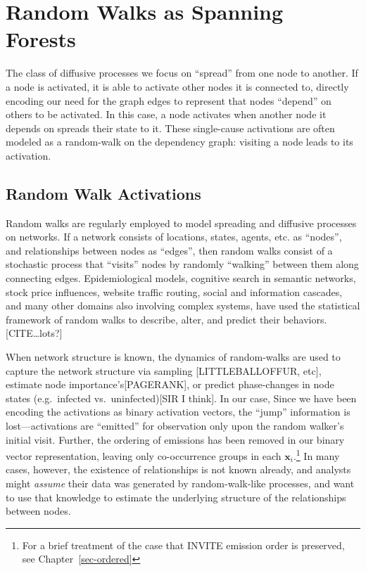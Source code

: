 \documentclass[%
	12pt,
		oneside,
		letterpaper
]{book}
\begin{document}
\section{Random Walks as Spanning
Forests}\label{random-walks-as-spanning-forests}

The class of diffusive processes we focus on ``spread'' from one node to
another. If a node is activated, it is able to activate other nodes it
is connected to, directly encoding our need for the graph edges to
represent that nodes ``depend'' on others to be activated. In this case,
a node activates when another node it depends on spreads their state to
it. These single-cause activations are often modeled as a random-walk on
the dependency graph: visiting a node leads to its activation.

\subsection{Random Walk Activations}\label{random-walk-activations}

Random walks are regularly employed to model spreading and diffusive
processes on networks. If a network consists of locations, states,
agents, etc. as ``nodes'', and relationships between nodes as ``edges'',
then random walks consist of a stochastic process that ``visits'' nodes
by randomly ``walking'' between them along connecting edges.
Epidemiological models, cognitive search in semantic networks, stock
price influences, website traffic routing, social and information
cascades, and many other domains also involving complex systems, have
used the statistical framework of random walks to describe, alter, and
predict their behaviors. {[}CITE\ldots lots?{]}

When network structure is known, the dynamics of random-walks are used
to capture the network structure via sampling {[}LITTLEBALLOFFUR,
etc{]}, estimate node importance's{[}PAGERANK{]}, or predict
phase-changes in node states (e.g.~infected vs.~uninfected){[}SIR I
think{]}. In our case, Since we have been encoding the activations as
binary activation vectors, the ``jump'' information is
lost---activations are ``emitted'' for observation only upon the random
walker's initial visit.\autocite{Humanmemorysearch_Jun2015} Further, the
ordering of emissions has been removed in our binary vector
representation, leaving only co-occurrence groups in each
\(\mathbf{x}_i\).\footnote{For a brief treatment of the case that INVITE
  emission order is preserved, see Chapter~\ref{sec-ordered}} In many
cases, however, the existence of relationships is not known already, and
analysts might \emph{assume} their data was generated by
random-walk-like processes, and want to use that knowledge to estimate
the underlying structure of the relationships between nodes.
\end{document}
